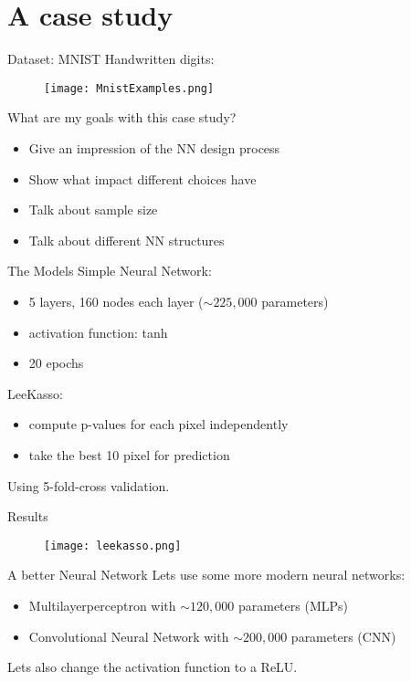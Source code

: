 \documentclass{beamer}
\begin{document}
\section{A case study}

\begin{frame}[t]{Dataset: MNIST}
  Handwritten digits:
  \begin{figure}[htpb]
    \centering
    \texttt{[image: MnistExamples.png]}
  \end{figure}
\end{frame}

\begin{frame}[t]{What are my goals with this case study?}
  \begin{itemize}
    \item Give an impression of the NN design process
    \item Show what impact different choices have
    \item Talk about sample size
    \item Talk about different NN structures
  \end{itemize}
\end{frame}

\begin{frame}[t]{The Models}
    Simple Neural Network:
      \begin{itemize}
        \item 5 layers, 160 nodes each layer ($\sim225,000$ parameters)
        \item activation function: tanh
        \item 20 epochs
      \end{itemize}
      LeeKasso:
      \begin{itemize}
        \item compute p-values for each pixel independently
        \item take the best 10 pixel for prediction
      \end{itemize}
  Using 5-fold-cross validation.
\end{frame}

\begin{frame}[t]{Results}
  \begin{figure}[htpb]
    \centering
    \texttt{[image: leekasso.png]}
  \end{figure}
\end{frame}

\begin{frame}[t]{A better Neural Network}
  Lets use some more modern neural networks:
  \begin{itemize}
    \item Multilayerperceptron with $\sim120,000$ parameters (MLPs)
    \item Convolutional Neural Network with $\sim200,000$ parameters (CNN)
  \end{itemize}
  Lets also change the activation function to a ReLU.
\end{frame}
\end{document}
